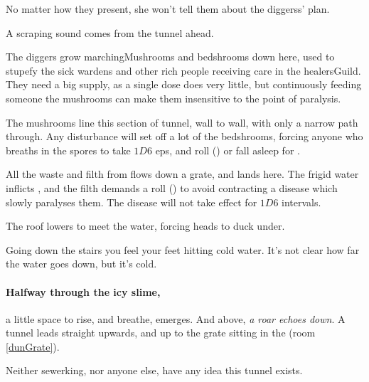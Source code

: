 \begin{multicols}{2}
No matter how they present, she won't tell them about the \glspl{diggers}' plan.

\begin{boxtext}
  A scraping sound comes from the tunnel ahead.
\end{boxtext}



The \gls{diggers} grow \glspl{marchingMushroom} and \glspl{bedshroom} down here, used to stupefy the sick \glspl{warden} and other rich people receiving care in the \gls{healersGuild}.
They need a big supply, as a single dose does very little, but continuously feeding someone the mushrooms can make them insensitive to the point of paralysis.

The mushrooms line this section of tunnel, wall to wall, with only a narrow path through.
Any disturbance will set off a lot of the \glspl{bedshroom}, forcing anyone who breaths in the spores to take $1D6$ \glspl{ep}, and roll  (\tn[12]) or fall asleep for .


All the waste and filth from  flows down a grate, and lands here.
The frigid water inflicts , and the filth demands a  roll (\tn[10]) to avoid contracting a disease which slowly paralyses them.%
The disease will not take effect for $1D6$ \glspl{interval}.

The roof lowers to meet the water, forcing heads to duck under.

\begin{boxtext}
  Going down the stairs you feel your feet hitting cold water.
  It's not clear how far the water goes down, but it's cold.
\end{boxtext}

\paragraph{Halfway through the icy slime,}
a little space to rise, and breathe, emerges.
And above, \emph{a roar echoes down}.
A tunnel leads straight upwards, and up to the grate sitting in the  (room \vref{dunGrate}).

Neither \gls{sewerking}, nor anyone else, have any idea this tunnel exists.


\end{multicols}
